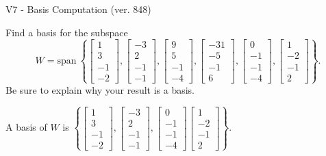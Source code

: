 \begin{exercise}
  \begin{exerciseTitle}V7 - Basis Computation (ver. 848)\end{exerciseTitle}
  \begin{exerciseStatement}
    Find a basis for the subspace 
\[W=\mathrm{span}\ \left\{\left[\begin{array}{r}
1 \\
3 \\
-1 \\
-2
\end{array}\right] , \left[\begin{array}{r}
-3 \\
2 \\
-1 \\
-1
\end{array}\right] , \left[\begin{array}{r}
9 \\
5 \\
-1 \\
-4
\end{array}\right] , \left[\begin{array}{r}
-31 \\
-5 \\
-1 \\
6
\end{array}\right] , \left[\begin{array}{r}
0 \\
-1 \\
-1 \\
-4
\end{array}\right] , \left[\begin{array}{r}
1 \\
-2 \\
-1 \\
2
\end{array}\right]\right\}.\]
 Be sure to explain why your result is a basis.


  \end{exerciseStatement}
  \begin{exerciseAnswer}
   A basis of \(W\) is  \(\left\{\left[\begin{array}{r}
1 \\
3 \\
-1 \\
-2
\end{array}\right] , \left[\begin{array}{r}
-3 \\
2 \\
-1 \\
-1
\end{array}\right] , \left[\begin{array}{r}
0 \\
-1 \\
-1 \\
-4
\end{array}\right] \left[\begin{array}{r}
1 \\
-2 \\
-1 \\
2
\end{array}\right]\right\}\).
  


  \end{exerciseAnswer}
\end{exercise}